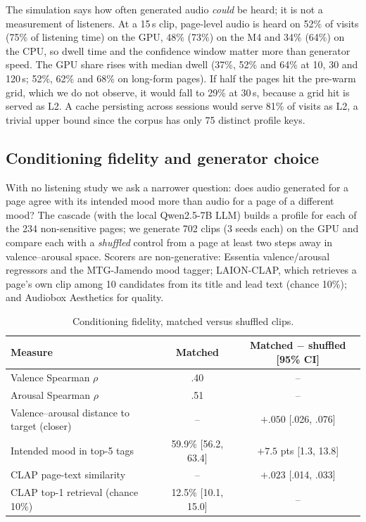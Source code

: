 \documentclass[conference]{IEEEtran}
\begin{document}
The simulation says how often generated audio \emph{could} be heard; it is not a
measurement of listeners. At a 15\,s clip, page-level audio is heard on 52\% of
visits (75\% of listening time) on the GPU, 48\% (73\%) on the M4 and 34\% (64\%)
on the CPU, so dwell time and the confidence window matter more than generator
speed. The GPU share rises with median dwell (37\%, 52\% and 64\% at 10, 30 and
120\,s; 52\%, 62\% and 68\% on long-form pages). If half the pages hit the
pre-warm grid, which we do not observe, it would fall to 29\% at 30\,s, because a
grid hit is served as L2. A cache persisting across sessions would serve 81\% of
visits as L2, a trivial upper bound since the corpus has only 75 distinct profile
keys.

\subsection{Conditioning fidelity and generator choice}
\label{sec:res-fidelity}

With no listening study we ask a narrower question: does audio generated for a
page agree with its intended mood more than audio for a page of a different mood?
The cascade (with the local Qwen2.5-7B LLM) builds a profile for each of the 234
non-sensitive pages; we generate 702 clips (3 seeds each) on the GPU and compare
each with a \emph{shuffled} control from a page at least two steps away in
valence--arousal space. Scorers are non-generative: Essentia valence/arousal
regressors and the MTG-Jamendo mood tagger; LAION-CLAP, which retrieves a page's
own clip among 10 candidates from its title and lead text (chance 10\%); and
Audiobox Aesthetics for quality.

\begin{table}[t]
\caption{Conditioning fidelity, matched versus shuffled clips.}
\label{tab:fidelity}
\begin{center}
\scriptsize
\setlength{\tabcolsep}{3pt}
\begin{tabular}{lcc}
\toprule
\textbf{Measure} & \textbf{Matched} & \textbf{Matched $-$ shuffled [95\% CI]} \\
\midrule
Valence Spearman $\rho$ & .40 & -- \\
Arousal Spearman $\rho$ & .51 & -- \\
Valence--arousal distance to target (closer) & -- & $+.050$ [.026, .076] \\
Intended mood in top-5 tags & 59.9\% [56.2, 63.4] & $+7.5$ pts [1.3, 13.8] \\
CLAP page-text similarity & -- & $+.023$ [.014, .033] \\
CLAP top-1 retrieval (chance 10\%) & 12.5\% [10.1, 15.0] & -- \\
\bottomrule
\end{tabular}
\end{center}
\end{table}
\end{document}
